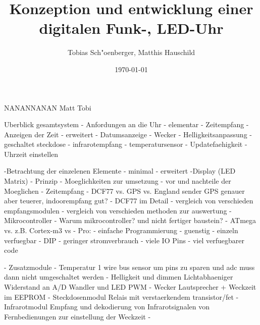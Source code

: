 \documentclass[16pt,a4paper]{article}
\title{Konzeption und entwicklung einer digitalen Funk-, LED-Uhr}
\author{Tobias Sch"oenberger, Matthis Hauschild}
\date{\today}
\begin{document}
\maketitle

NANANNANAN Matt\cite{cite1} Tobi\cite{cite2}

Uberblick gesamtsystem
- Anfordungen an die Uhr
 - elementar
  - Zeitempfang
  - Anzeigen der Zeit
 - erweitert
  - Datumsanzeige
  - Wecker
  - Helligkeitsanpassung
  - geschaltet steckdose
  - infrarotempfang
  - temperatursensor
  - Updatefaehigkeit
  - Uhrzeit einstellen
  
-Betrachtung der einzelenen Elemente
 - minimal
 - erweitert
-Display (LED Matrix)
 - Prinzip
 - Moeglichkeiten zur umsetzung
 - vor und nachteile der Moeglichen
- Zeitempfang
 - DCF77 vs. GPS vs. England sender
   GPS genauer aber teuerer, indoorempfang gut?
 - DCF77 im Detail
 - vergleich von verschieden empfangsmodulen
 - vergleich von verschieden methoden zur auswertung
- Mikrocontroller
 - Warum mikrocontroller? und nicht fertiger baustein?
 - ATmega vs. z.B. Cortex-m3 vs 
 - Pro:
  - einfache Programmierung
  - guenstig
  - einzeln verfuegbar
  - DIP
  - geringer stromverbrauch
  - viele IO Pins
  - viel verfuegbarer code

 
- Zusatzmodule
 - Temperatur
  1 wire bus sensor um pins zu sparen und adc muss dann nicht umgeschaltet werden
 - Helligkeit und dimmen
  Lichtabhaeniger Widerstand an A/D Wandler und LED PWM
 - Wecker
  Lautsprecher + Weckzeit im EEPROM
 - Steckdosenmodul
  Relais mit verstaerkendem transistor/fet
 - Infrarotmodul
  Empfang und dekodierung von Infrarotsignalen von Fernbedienungen zur einstellung der Weckzeit
 -



\end{document}
